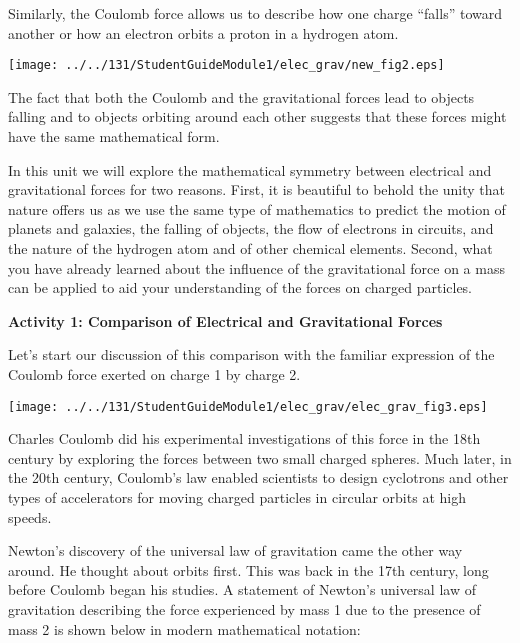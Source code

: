 \pagebreak[2]
Similarly, the Coulomb force allows us to describe how one charge ``falls''
toward another or how an electron orbits a proton in a hydrogen atom. 

\answerspace{0.3cm}
\begin{center}
\texttt{[image: ../../131/StudentGuideModule1/elec\_grav/new\_fig2.eps]} 
\end{center}
\answerspace{0.3cm}

The fact that both the Coulomb and the gravitational forces lead to objects
falling and to objects orbiting around each other suggests that these forces
might have the same mathematical form. 

In this unit we will explore the mathematical symmetry between electrical and
gravitational forces for two reasons. First, it is beautiful to behold the unity
that nature offers us as we use the same type of mathematics to predict the
motion of planets and galaxies, the falling of objects, the flow of electrons
in circuits, and the nature of the hydrogen atom and of other chemical elements.
Second, what you have already learned about the influence of the gravitational
force on a mass can be applied to aid your understanding of the forces on charged
particles. 

\textbf{Activity 1: Comparison of Electrical and Gravitational Forces }

Let's start our discussion of this comparison with the familiar expression of
the Coulomb force exerted on charge 1 by charge 2. 

\answerspace{0.3cm}
{\par\centering \texttt{[image: ../../131/StudentGuideModule1/elec\_grav/elec\_grav\_fig3.eps]} \par}
\answerspace{0.3cm}

Charles Coulomb did his experimental investigations of this force in the 18th
century by exploring the forces between two small charged spheres. Much later,
in the 20th century, Coulomb's law enabled scientists to design cyclotrons and
other types of accelerators for moving charged particles in circular orbits
at high speeds. 

Newton's discovery of the universal law of gravitation came the other way around.
He thought about orbits first. This was back in the 17th century, long before
Coulomb began his studies. A statement of Newton's universal law of gravitation
describing the force experienced by mass 1 due to the presence of mass 2 is
shown below in modern mathematical notation: 

